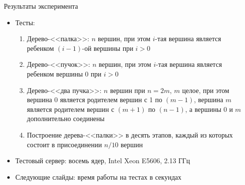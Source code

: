 \documentclass[hyperref=unicode,graphics=pdflatex,13pt]{beamer}
\begin{document}
\begin{frame}[shrink]{Результаты эксперимента}
\begin{itemize}
    \item Тесты:
	\begin{enumerate}
	    \item Дерево-<<палка>>: $n$ вершин, при этом $i$-тая вершина является ребенком $(i-1)$-ой 
	вершины при $i > 0$
	    \item Дерево-<<пучок>>: $n$ вершин, при этом $i$-тая вершина является ребенком вершины 0 при 
	$i > 0$
	    \item Дерево-<<два пучка>>: $n$ вершин при $n = 2m$, $m$ целое, при этом вершина 0 является 
	родителем вершин с 1 по $(m-1)$, 
	вершина $m$ является родителем вершин с $(m+1)$ по $(n-1)$, а вершины 0 и $m$ 
	дополнительно соединены
	    \item Построение дерева-<<палки>> в десять этапов, каждый из которых состоит в присоединении 
	$n / 10$ вершин
	\end{enumerate}
    \item Тестовый сервер: восемь ядер, Intel Xeon E5606, 2.13 ГГц
    \item Следующие слайды: время работы на тестах в секундах
\end{itemize}
\end{frame}
\end{document}
